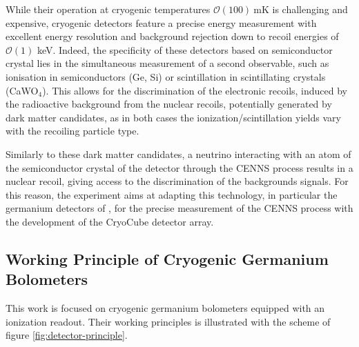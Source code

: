 While their operation at cryogenic temperatures $\mathcal{O}(100)\ \si{\milli\kelvin}$ is challenging and expensive, cryogenic detectors feature a precise energy measurement with excellent energy resolution and background rejection down to recoil energies of $\mathcal{O}(1)$ \si{\kilo\eV}.
Indeed, the specificity of these detectors based on semiconductor crystal lies in the simultaneous measurement of a second observable, such as ionisation in semiconductors (Ge, Si) or scintillation in scintillating crystals (CaWO$_4$). This allows for the discrimination of the electronic recoils, induced by the radioactive background from the nuclear recoils, potentially generated by dark matter candidates, as in both cases the ionization/scintillation yields vary with the recoiling particle type.

Similarly to these dark matter candidates, a neutrino interacting with an atom of the semiconductor crystal of the detector through the CENNS process results in a nuclear recoil, giving access to the discrimination of the backgrounds signals.
For this reason, the \Ricochet{} experiment aims at adapting this technology, in particular the germanium detectors of \Edelweiss{}, for the precise measurement of the CENNS process with the development of the CryoCube detector array.


\subsection{Working Principle of Cryogenic Germanium Bolometers}

This work is focused on cryogenic germanium bolometers equipped with an ionization readout. Their working principles is illustrated with the scheme of figure \ref{fig:detector-principle}.

